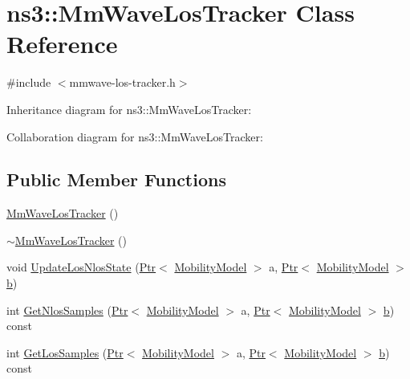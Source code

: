 \hypertarget{classns3_1_1MmWaveLosTracker}{}\section{ns3\+:\+:Mm\+Wave\+Los\+Tracker Class Reference}
\label{classns3_1_1MmWaveLosTracker}


{\ttfamily \#include $<$mmwave-\/los-\/tracker.\+h$>$}



Inheritance diagram for ns3\+:\+:Mm\+Wave\+Los\+Tracker\+:


Collaboration diagram for ns3\+:\+:Mm\+Wave\+Los\+Tracker\+:
\subsection*{Public Member Functions}
\begin{DoxyCompactItemize}
\item 
\hyperlink{classns3_1_1MmWaveLosTracker_ada61d6205bcd1c6955c88b324cf1f670}{Mm\+Wave\+Los\+Tracker} ()
\item 
\hyperlink{classns3_1_1MmWaveLosTracker_ac5bb7b83d9cfc732c755df2062248548}{$\sim$\+Mm\+Wave\+Los\+Tracker} ()
\item 
void \hyperlink{classns3_1_1MmWaveLosTracker_ab7da930a74b9fbe3c972724bccd77616}{Update\+Los\+Nlos\+State} (\hyperlink{classns3_1_1Ptr}{Ptr}$<$ \hyperlink{classns3_1_1MobilityModel}{Mobility\+Model} $>$ a, \hyperlink{classns3_1_1Ptr}{Ptr}$<$ \hyperlink{classns3_1_1MobilityModel}{Mobility\+Model} $>$ \hyperlink{lte__pathloss_8m_a21ad0bd836b90d08f4cf640b4c298e7c}{b})
\item 
int \hyperlink{classns3_1_1MmWaveLosTracker_ae04d459e8527454cf0122835dddcae96}{Get\+Nlos\+Samples} (\hyperlink{classns3_1_1Ptr}{Ptr}$<$ \hyperlink{classns3_1_1MobilityModel}{Mobility\+Model} $>$ a, \hyperlink{classns3_1_1Ptr}{Ptr}$<$ \hyperlink{classns3_1_1MobilityModel}{Mobility\+Model} $>$ \hyperlink{lte__pathloss_8m_a21ad0bd836b90d08f4cf640b4c298e7c}{b}) const 
\item 
int \hyperlink{classns3_1_1MmWaveLosTracker_a2ff0eb8d3127874598b09926d0922349}{Get\+Los\+Samples} (\hyperlink{classns3_1_1Ptr}{Ptr}$<$ \hyperlink{classns3_1_1MobilityModel}{Mobility\+Model} $>$ a, \hyperlink{classns3_1_1Ptr}{Ptr}$<$ \hyperlink{classns3_1_1MobilityModel}{Mobility\+Model} $>$ \hyperlink{lte__pathloss_8m_a21ad0bd836b90d08f4cf640b4c298e7c}{b}) const 
\end{DoxyCompactItemize}

